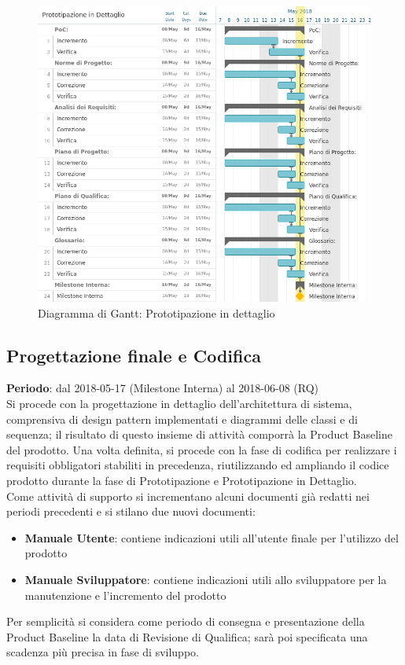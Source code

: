 \begin{figure}[h!]
	\centerline{\includegraphics[scale=0.5]{img/DiagrammiGantt/PrototipazioneDettaglio.jpg}}
	\caption{Diagramma di Gantt: Prototipazione in dettaglio}
	\label{fig:gantt_prot_dett}
\end{figure}
\clearpage

\subsection{Progettazione finale e Codifica}
\textbf{Periodo}: dal 2018-05-17 (Milestone Interna) al 2018-06-08 (RQ)\\

Si procede con la progettazione in dettaglio dell'architettura di sistema, comprensiva di design pattern implementati e diagrammi delle classi e di sequenza; il risultato di questo insieme di attività comporrà la Product Baseline del prodotto. Una volta definita, si procede con la fase di codifica per realizzare i requisiti obbligatori stabiliti in precedenza, riutilizzando ed ampliando il codice prodotto durante la fase di Prototipazione e Prototipazione in Dettaglio. \\
Come attività di supporto si incrementano alcuni documenti già redatti nei periodi precedenti e si stilano due nuovi documenti:
\begin{itemize}
	\item \textbf{Manuale Utente}: contiene indicazioni utili all'utente finale per l'utilizzo del prodotto
	\item \textbf{Manuale Sviluppatore}: contiene indicazioni utili allo sviluppatore per la manutenzione e l'incremento del prodotto
\end{itemize}
Per semplicità si considera come periodo di consegna e presentazione della Product Baseline la data di Revisione di Qualifica; sarà poi specificata una scadenza più precisa in fase di sviluppo.

